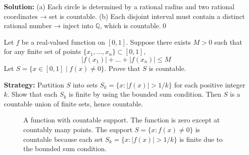 \bigskip\noindent\textbf{Solution:}  
(a) Each circle is determined by a rational radius and two rational coordinates → set is countable.  
(b) Each disjoint interval must contain a distinct rational number → inject into \( \mathbb{Q} \), which is countable.\qed



\begin{problembox}
Let \( f \) be a real-valued function on \( [0,1] \). Suppose there exists \( M > 0 \) such that for any finite set of points \( \{x_1, \dots, x_n\} \subset [0,1] \),  
\[
|f(x_1)| + \dots + |f(x_n)| \le M
\]  
Let \( S = \{x \in [0,1] \mid f(x) \ne 0\} \). Prove that \( S \) is countable.
\end{problembox}

\noindent\textbf{Strategy:} Partition $S$ into sets $S_k = \{x : |f(x)| > 1/k\}$ for each positive integer $k$. Show that each $S_k$ is finite by using the bounded sum condition. Then $S$ is a countable union of finite sets, hence countable.

\begin{figure}[h]
\centering
{}
\caption{A function with countable support. The function is zero except at countably many points. The support $S = \{x : f(x) \neq 0\}$ is countable because each set $S_k = \{x : |f(x)| > 1/k\}$ is finite due to the bounded sum condition.}
\end{figure}

